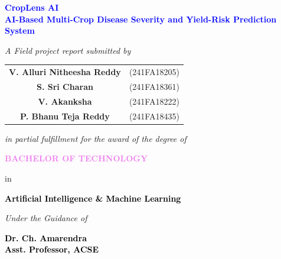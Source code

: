 \thispagestyle{empty}
\graphicspath{{Figures/}}

\begin{center}

\vspace{6mm}

\huge \textcolor{blue}{\textbf{CropLens AI}} \\
\vspace{2mm}
\Large \textcolor{blue}{\textbf{AI-Based Multi-Crop Disease Severity and Yield-Risk Prediction System}} \\

\vspace{6mm}

\Large \textit{A Field project report submitted by}

\vspace{4mm}

\renewcommand{\arraystretch}{1.25}
\begin{tabular}{c c}
\textbf{\large V. Alluri Nitheesha Reddy} & {\large (241FA18205)} \\
\textbf{\large S. Sri Charan}             & {\large (241FA18361)} \\
\textbf{\large V. Akanksha}               & {\large (241FA18222)} \\
\textbf{\large P. Bhanu Teja Reddy}       & {\large (241FA18435)} \\
\end{tabular}

\vspace{5mm}

\large \textit{in partial fulfillment for the award of the degree of}

\vspace{4mm}

\Large {\textbf{\textcolor{violet}{BACHELOR OF TECHNOLOGY}}}

\vspace{2mm}

\large in

\vspace{2mm}

\textbf{{\emph \large {\textcolor{black}{Artificial Intelligence \& Machine Learning}}}}

\vspace{4mm}

{\large \textit{Under the Guidance of}}

\vspace{2mm}

\Large \textbf{\textcolor{black}{Dr. Ch. Amarendra}} \\
\large \textbf{\textcolor{black}{Asst. Professor, ACSE}}


\end{center}
